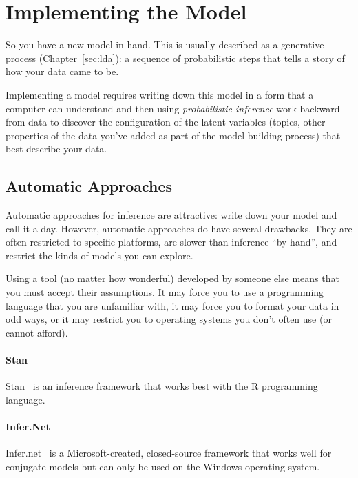 \section{Implementing the Model}

So you have a new model in hand.  This is usually described as a
generative process (Chapter~\ref{sec:lda}): a sequence of probabilistic steps
that tells a story of how your data came to be.

Implementing a model requires writing down this model in a form that a
computer can understand and then using \emph{probabilistic inference}
work backward from data to discover the configuration of the latent
variables (topics, other properties of the data you've added as part
of the model-building process) that best describe your data.

\subsection{Automatic Approaches}

Automatic approaches for inference are attractive: write down your
model and call it a day.  However, automatic approaches do have several drawbacks.  They are
often restricted to specific platforms, are slower than inference ``by
hand'', and restrict the kinds of models you can explore.

Using a tool (no matter how wonderful) developed by someone else means
that you must accept their assumptions.  It may force you to use a
programming language that you are unfamiliar with, it may force you to
format your data in odd ways, or it may restrict you to operating
systems you don't often use (or cannot afford).


\paragraph{Stan}

Stan~\citep{stan-software:2014} is an inference framework that works best with the R programming
language.

\paragraph{Infer.Net}

Infer.net~\citep{InferNET14} is a Microsoft-created, closed-source framework that works well for conjugate
models but can only be used on the Windows operating system.

